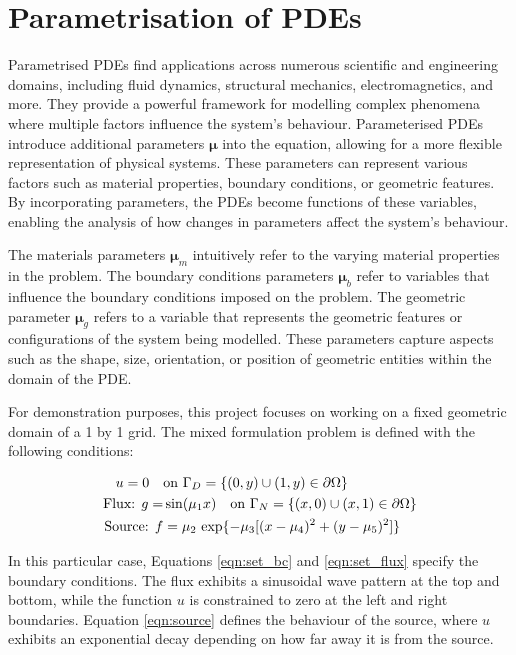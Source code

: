 \section{Parametrisation of PDEs}

Parametrised PDEs find applications across numerous scientific and engineering domains, including fluid dynamics, structural mechanics, electromagnetics, and more. They provide a powerful framework for modelling complex phenomena where multiple factors influence the system's behaviour. Parameterised PDEs introduce additional parameters $\bm{\mu}$ into the equation, allowing for a more flexible representation of physical systems. These parameters can represent various factors such as material properties, boundary conditions, or geometric features. By incorporating parameters, the PDEs become functions of these variables, enabling the analysis of how changes in parameters affect the system's behaviour. 

The materials parameters $\bm{\mu}_m$ intuitively refer to the varying material properties in the problem. The boundary conditions parameters $\bm{\mu}_b$ refer to variables that influence the boundary conditions imposed on the problem. The geometric parameter $\bm{\mu}_g$ refers to a variable that represents the geometric features or configurations of the system being modelled. These parameters capture aspects such as the shape, size, orientation, or position of geometric entities within the domain of the PDE.

For demonstration purposes, this project focuses on working on a fixed geometric domain of a 1 by 1 grid. The mixed formulation problem is defined with the following conditions: 

\begin{align}
    u = 0 \quad & {\rm on} \ \Gamma_{D} = \{(0, y) \cup (1, y) \in \partial \Omega\} \label{eqn:set_bc} \\
    \text{Flux: }  g = & \sin(\mu_1 x)  \quad {\rm on} \ \Gamma_{N} = \{(x, 0) \cup (x, 1) \in \partial \Omega\} \label{eqn:set_flux} \\   
    \text{Source: } f & = \mu_2 \, \exp \{-\mu_3[(x-\mu_4)^2 + (y-\mu_5)^2]\}  \label{eqn:source}
\end{align}

In this particular case, Equations \ref{eqn:set_bc} and \ref{eqn:set_flux} specify the boundary conditions. The flux exhibits a sinusoidal wave pattern at the top and bottom, while the function $u$ is constrained to zero at the left and right boundaries.
Equation \ref{eqn:source} defines the behaviour of the source, where $u$ exhibits an exponential decay depending on how far away it is from the source.

